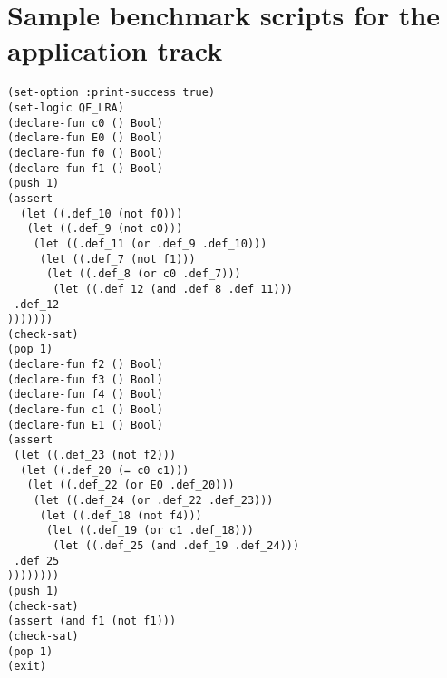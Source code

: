 \documentclass[12pt]{article}
\begin{document}
\section{Sample benchmark scripts for the application track}

\footnotesize
\begin{verbatim}
(set-option :print-success true)
(set-logic QF_LRA)
(declare-fun c0 () Bool)
(declare-fun E0 () Bool)
(declare-fun f0 () Bool)
(declare-fun f1 () Bool)
(push 1)
(assert 
  (let ((.def_10 (not f0)))
   (let ((.def_9 (not c0)))
    (let ((.def_11 (or .def_9 .def_10)))
     (let ((.def_7 (not f1)))
      (let ((.def_8 (or c0 .def_7)))
       (let ((.def_12 (and .def_8 .def_11)))
 .def_12
)))))))
(check-sat)
(pop 1)
(declare-fun f2 () Bool)
(declare-fun f3 () Bool)
(declare-fun f4 () Bool)
(declare-fun c1 () Bool)
(declare-fun E1 () Bool)
(assert 
 (let ((.def_23 (not f2)))
  (let ((.def_20 (= c0 c1)))
   (let ((.def_22 (or E0 .def_20)))
    (let ((.def_24 (or .def_22 .def_23)))
     (let ((.def_18 (not f4)))
      (let ((.def_19 (or c1 .def_18)))
       (let ((.def_25 (and .def_19 .def_24)))
 .def_25
))))))))
(push 1)
(check-sat)
(assert (and f1 (not f1)))
(check-sat)
(pop 1)
(exit)
\end{verbatim}
\end{document}
